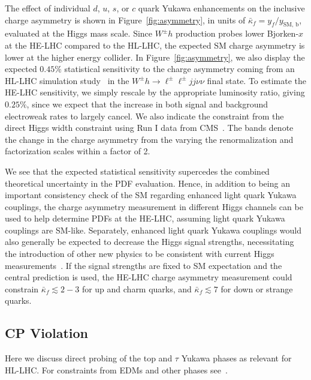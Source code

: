 \documentclass[../report.tex]{subfiles}
\begin{document}
The effect of individual $d$, $u$, $s$, or $c$ quark Yukawa
enhancements on the inclusive charge asymmetry is shown in
Figure~\ref{fig:asymmetry}, in units of $\bar{\kappa}_f = y_f /
y_{\text{SM, b}}$, evaluated at the Higgs mass scale.  Since $W^\pm h$
production probes lower Bjorken-$x$ at the HE-LHC compared to the
HL-LHC, the expected SM charge asymmetry is lower at the higher energy
collider.  In Figure~\ref{fig:asymmetry}, we also display the expected
$0.45\%$ statistical sensitivity to the charge asymmetry coming from
an HL-LHC simulation study~\cite{Yu:2016rvv} in the $W^\pm h \to
\ell^\pm \ell^\pm jj \nu \nu$ final state.  To estimate the HE-LHC
sensitivity, we simply rescale by the appropriate luminosity ratio,
giving $0.25\%$, since we expect that the increase in both signal and
background electroweak rates to largely cancel.  We also indicate the
constraint from the direct Higgs width constraint using Run I data
from CMS~\cite{Yu:2016rvv}.  The bands denote the change in the charge
asymmetry from the varying the renormalization and factorization
scales within a factor of 2.

We see that the expected statistical sensitivity supercedes the
combined theoretical uncertainty in the PDF evaluation.  Hence, in
addition to being an important consistency check of the SM regarding
enhanced light quark Yukawa couplings, the charge asymmetry
measurement in different Higgs channels can be used to help determine
PDFs at the HE-LHC, assuming light quark Yukawa couplings are SM-like.
Separately, enhanced light quark Yukawa couplings would also generally
be expected to decrease the Higgs signal strengths, necessitating the
introduction of other new physics to be consistent with current Higgs
measurements~\cite{Yu:2016rvv}.  If the signal strengths are fixed to
SM expectation and the central prediction is used, the HE-LHC charge
asymmetry measurement could constrain $\bar{\kappa}_f \lesssim 2-3$
for up and charm quarks, and $\bar{\kappa}_f \lesssim 7$ for down or
strange quarks.





\subsection{CP Violation}

Here we discuss direct probing of the top and $\tau$ Yukawa phases as relevant for HL-LHC. For constraints from EDMs and other phases see~\cite{Brod:2013cka,Chien:2015xha,Altmannshofer:2015qra,Brod:2018pli,Baron:2013eja,Andreev:2018ayy,Altmannshofer:2015qra}. 
\end{document}
